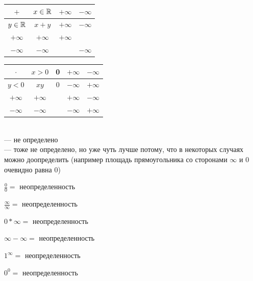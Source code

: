   	\begin{minipage}{0\textwidth}
	  \begin{flushleft}
		\begin{tabular}{|c|c|c|c|} \hline
  	    $+$ & $x \in \operatorname*{\mathbb{R}}$ & $+ \infty$ & $- \infty$ \\ \hline 
  		$y \in \operatorname*{\mathbb{R}} $ & $x+y$ & $+ \infty$ & $- \infty$  \\ \hline 
        $+ \infty $ & $+ \infty$ & $+ \infty$ &  \frownie{} \\ \hline 
        $- \infty $ & $- \infty $ & \frownie{} & $- \infty$  \\ \hline 
  \end{tabular} 
	  \end{flushleft}
	\end{minipage} 
	\begin{minipage}{0.7\textwidth}
	  \begin{flushright}
		\begin{tabular}{|c|c|c|c|c|} \hline
	   	    $\cdot$ & $x > 0$ & 0 & $+ \infty$ & $- \infty$ \\ \hline 
	   		$y < 0 $ & $xy$ & 0 & $- \infty$ & $+ \infty$  \\ \hline 
	        $+ \infty $ & $+ \infty$ & \smiley{} & $+ \infty$ &  $- \infty$ \\ \hline 
	        $- \infty $ & $- \infty$ & \smiley{} & $-\infty$ & $+\infty$  \\ \hline 
	   \end{tabular} 
	  \end{flushright}
	\end{minipage}
   	 
  	\begin{remark} \nobreakspace \\
  		\frownie{} --- не определено \\
  		\smiley{} --- тоже не определено, но уже чуть лучше потому, что в некоторых случаях можно доопределить (например площадь прямоугольника со сторонами $\infty$ и $0$ очевидно равна 0)
  	\end{remark}

$\frac{0}{0} =$ неопределенность

$\frac{\infty}{\infty} =$ неопределенность

$0 * \infty =$ неопределенность

$\infty - \infty =$ неопределенность

$1^\infty =$ неопределенность

$0^0 =$ неопределенность

